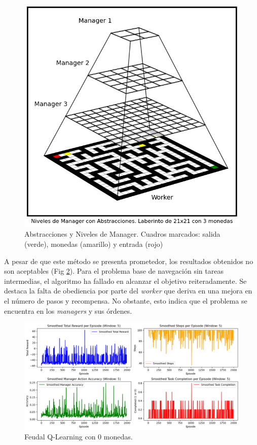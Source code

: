 \documentclass[letterpaper]{article} %
\begin{document}
\begin{figure}[H]
    \centering
    \includegraphics[width=\columnwidth]{abstractions.png}
    \caption{Abstracciones y Niveles de Manager. Cuadros marcados: salida (verde), monedas (amarillo) y entrada (rojo) \label{fig:feudal-abstract}}
\end{figure}

A pesar de que este método se presenta prometedor, los resultados obtenidos no son aceptables (Fig \ref{fig:q-orig-results}). Para el 
problema base de navegación sin tareas intermedias, el algoritmo ha fallado en alcanzar el objetivo reiteradamente. Se destaca la falta
de obediencia por parte del \textit{worker} que deriva en una mejora en el número de pasos y recompensa. No obstante, esto indica que el problema 
se encuentra en los \textit{managers} y sus órdenes. 

\begin{figure}[H]
    \centering
    \includegraphics[width=\columnwidth]{q-original-results.png}
    \caption{Feudal Q-Learning con 0 monedas.\label{fig:q-orig-results}}
\end{figure}
\end{document}
